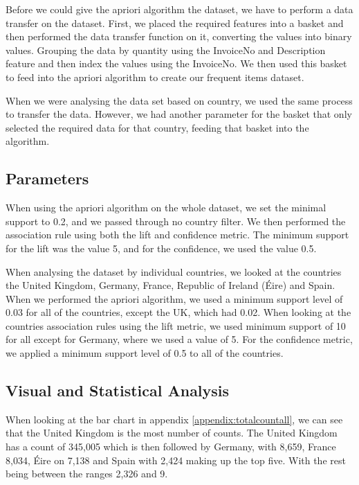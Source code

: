 \documentclass[a4paper,10pt]{article}
\begin{document}
Before we could give the apriori algorithm the dataset, we have to perform a data transfer on the dataset. First, we placed the required features into a basket and then performed the data transfer function on it, converting the values into binary values. Grouping the data by quantity using the InvoiceNo and Description feature and then index the values using the InvoiceNo. We then used this basket to feed into the apriori algorithm to create our frequent items dataset.

When we were analysing the data set based on country, we used the same process to transfer the data. However, we had another parameter for the basket that only selected the required data for that country, feeding that basket into the algorithm.



\subsection{Parameters}

When using the apriori algorithm on the whole dataset, we set the minimal support to 0.2, and we passed through no country filter. We then performed the association rule using both the lift and confidence metric. The minimum support for the lift was the value 5, and for the confidence, we used the value 0.5.

When analysing the dataset by individual countries, we looked at the countries the United Kingdom, Germany, France, Republic of Ireland (Éire) and Spain. When we performed the apriori algorithm, we used a minimum support level of 0.03 for all of the countries, except the UK, which had 0.02. When looking at the countries association rules using the lift metric, we used minimum support of 10 for all except for Germany, where we used a value of 5. For the confidence metric, we applied a minimum support level of 0.5 to all of the countries.

\subsection{Visual and Statistical Analysis}

When looking at the bar chart in appendix \ref{appendix:totalcountall}, we can see that the United Kingdom is the most number of counts. The United Kingdom has a count of 345,005 which is then followed by Germany, with 8,659, France 8,034, Éire on 7,138 and Spain with 2,424 making up the top five. With the rest being between the ranges 2,326 and 9.
\end{document}
